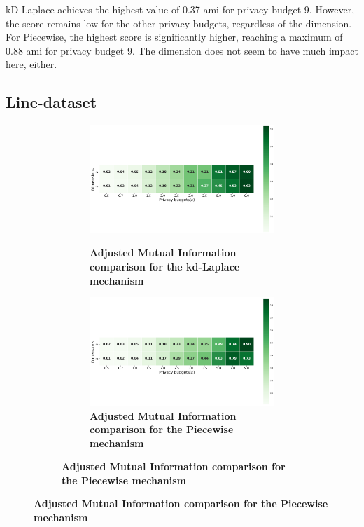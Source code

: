kD-Laplace achieves the highest value of 0.37 \gls{ami} for privacy budget 9. However, the score remains low for the other privacy budgets, regardless of the dimension.
For Piecewise, the highest score is significantly higher, reaching a maximum of 0.88 \gls{ami} for privacy budget 9. The dimension does not seem to have much impact here, either.
\newpage
\subsection{Line-dataset}
\begin{figure}[H]
  \centering
  \begin{subfigure}[b]{0.85\textwidth}
    \begin{subfigure}[c]{1\textwidth}
      \caption{\textbf{Adjusted Mutual Information comparison for the kd-Laplace mechanism}}
      \includegraphics[width=1\textwidth]{Results/kd-laplace/kd-Laplace/line-dataset/ami.png}
      \label{fig:ami_line-dataset_comparison_kdlaplace_2d}
    \end{subfigure}
    \vfill %
    \begin{subfigure}[c]{1\textwidth}
      \caption{\textbf{Adjusted Mutual Information comparison for the Piecewise mechanism}}
      \includegraphics[width=1\textwidth]{Results/kd-laplace/piecewise/line-dataset/ami.png}

\end{subfigure}
\end{subfigure}
\end{figure}
